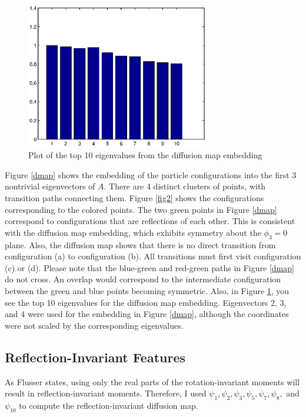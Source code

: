 \begin{figure}[t]
\centering
\includegraphics[width=8cm]{evals.eps}
\caption[Eigenvalue spectrum for diffusion maps embedding of Lennard-Jones cluster]{Plot of the top 10 eigenvalues from the diffusion map embedding}
\label{evals}
\end{figure}

Figure \ref{dmap} shows the embedding of the particle configurations into the first 3 nontrivial eigenvectors of $A$. There are 4 distinct clusters of points, with transition paths connecting them. Figure \ref{fig2} shows the configurations corresponding to the colored points. The two green points in Figure \ref{dmap} correspond to configurations that are reflections of each other. This is consistent with the diffusion map embedding, which exhibits symmetry about the $\phi_3=0$ plane. Also, the diffusion map shows that there is no direct transition from configuration (a) to configuration (b). All transitions must first visit configuration (c) or (d). Please note that the blue-green and red-green paths in Figure \ref{dmap} do not cross. An overlap would correspond to the intermediate configuration  between the green and blue points becoming symmetric. Also, in Figure \ref{evals}, you see the top 10 eigenvalues for the diffusion map embedding. Eigenvectors 2, 3, and 4 were used for the embedding in Figure \ref{dmap}, although the coordinates were not scaled by the corresponding eigenvalues. 

\subsection{Reflection-Invariant Features}

As Flusser states, using only the real parts of the rotation-invariant moments will result in reflection-invariant moments. Therefore, I used $\psi_1,\psi_2, \psi_3,\psi_5,\psi_7,\psi_8,$ and $\psi_{10}$ to compute the reflection-invariant diffusion map.

